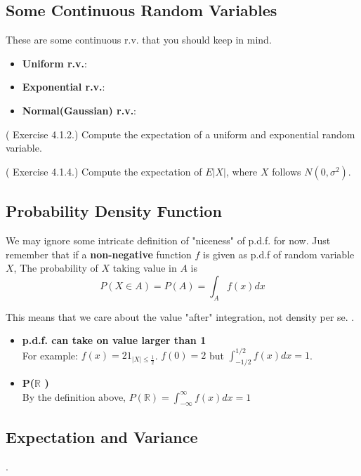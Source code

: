 \subsection{Some Continuous Random Variables}
These are some continuous r.v. that you should keep in mind. 
\begin{itemize}
    \item \textbf{Uniform r.v.}:\\
    \item \textbf{Exponential r.v.}: \\
    \item \textbf{Normal(Gaussian) r.v.}: \\   
\end{itemize}
\begin{eg}
    (\cite{IntroPanchenko} Exercise 4.1.2.) Compute the expectation of a uniform and
exponential random variable.
\end{eg}
\begin{exercise}
    (\cite{IntroPanchenko} Exercise 4.1.4.) Compute the expectation of \(E |X|\), where \(X\) follows \(N(0,\sigma^2)\).  
\end{exercise}
\subsection{Probability Density Function}
We may ignore some intricate definition of "niceness" of p.d.f. for now. Just remember that if a \textbf{non-negative} function \(f\) is given as p.d.f of random variable \(X\), 
The probability of \(X\) taking value in \(A\) is 
\[
    P(X \in A) = P(A) = \int_A f(x)dx
\] 

This means that we care about the value "after" integration, not density per se. .
\begin{itemize}
    \item \textbf{p.d.f. can take on value larger than 1} \\ 
            For example: \(f(x) = 2 1_{|X| \leq  \frac{1}{2}} \). \(f(0) = 2\) but \(\int_{-1 /2 }^{1 /2} f(x)dx  = 1\).   
    \item \textbf{P(\(\mathbb{R} \) )}\\ 
            By the definition above, \(P(\mathbb{R} ) = \int_{-\infty }^{\infty} f(x)dx = 1 \)   
\end{itemize}

\subsection{Expectation and Variance}. 

